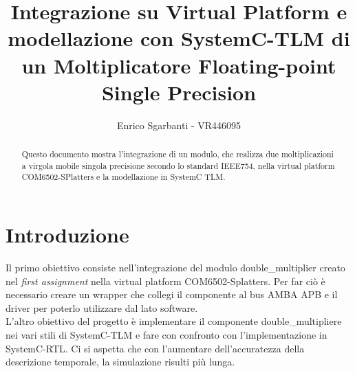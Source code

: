 \documentclass[]{IEEEtran}
\title{Integrazione su Virtual Platform e modellazione con SystemC-TLM di un Moltiplicatore Floating-point Single Precision}
\author{Enrico Sgarbanti - VR446095}
\begin{document}
\maketitle



\begin{abstract}
    Questo documento mostra l'integrazione di un modulo, che realizza due moltiplicazioni a virgola mobile singola precisione secondo lo standard IEEE754\cite{IEEE754}, nella virtual platform COM6502-SPlatters e la modellazione in SystemC\cite{SystemC} TLM.
\end{abstract}



\section{Introduzione}
Il primo obiettivo consiste nell'integrazione del modulo double\_multiplier creato nel \textit{first assignment} nella virtual platform COM6502-Splatters. Per far ciò è necessario creare un wrapper che collegi il componente al bus AMBA APB e il driver per poterlo utilizzare dal lato software.
\\L'altro obiettivo del progetto è implementare il componente double\_multipliere nei vari stili di SystemC-TLM e fare con confronto con l'implementazione in SystemC-RTL. Ci si aspetta che con l'aumentare dell'accuratezza della descrizione temporale, la simulazione risulti più lunga.
\end{document}
